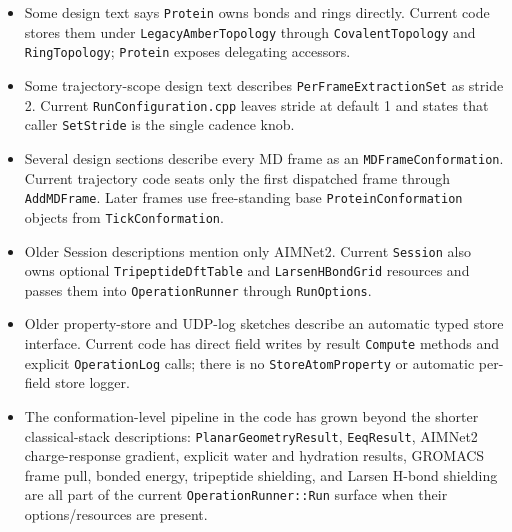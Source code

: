 \documentclass[11pt]{article}
\newcommand{\code}[1]{\texttt{#1}}
\begin{document}
\begin{itemize}
\item Some design text says \code{Protein} owns bonds and rings directly.
Current code stores them under \code{LegacyAmberTopology} through
\code{CovalentTopology} and \code{RingTopology}; \code{Protein} exposes
delegating accessors.

\item Some trajectory-scope design text describes \code{PerFrameExtractionSet}
as stride 2. Current \code{RunConfiguration.cpp} leaves stride at default 1
and states that caller \code{SetStride} is the single cadence knob.

\item Several design sections describe every MD frame as an
\code{MDFrameConformation}. Current trajectory code seats only the first
dispatched frame through \code{AddMDFrame}. Later frames use free-standing
base \code{ProteinConformation} objects from \code{TickConformation}.

\item Older Session descriptions mention only AIMNet2. Current \code{Session}
also owns optional \code{TripeptideDftTable} and \code{LarsenHBondGrid}
resources and passes them into \code{OperationRunner} through
\code{RunOptions}.

\item Older property-store and UDP-log sketches describe an automatic typed
store interface. Current code has direct field writes by result
\code{Compute} methods and explicit \code{OperationLog} calls; there is no
\code{StoreAtomProperty} or automatic per-field store logger.

\item The conformation-level pipeline in the code has grown beyond the
shorter classical-stack descriptions: \code{PlanarGeometryResult},
\code{EeqResult}, AIMNet2 charge-response gradient, explicit water and
hydration results, GROMACS frame pull, bonded energy, tripeptide shielding,
and Larsen H-bond shielding are all part of the current
\code{OperationRunner::Run} surface when their options/resources are present.
\end{itemize}
\end{document}

